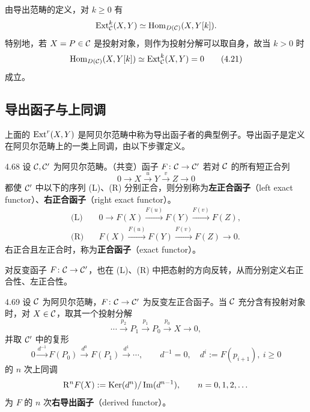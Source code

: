 由导出范畴的定义，对 $k\ge 0$ 有
\[ \operatorname{Ext}^k_{\mathcal{C}}(X,Y)\simeq\operatorname{Hom}_{D(\mathcal{C})}(X,Y[k]). \]
特别地，若 $X=P\in\mathcal{C}$ 是投射对象，则作为投射分解可以取自身，故当 $k>0$ 时
\begin{equation}
  \operatorname{Hom}_{D(\mathcal{C})}(X,Y[k])\simeq\operatorname{Ext}^k_{\mathcal{C}}(X,Y)=0 \tag{4.21}
\end{equation}
成立。

\subsection{导出函子与上同调}

上面的 $\operatorname{Ext}^r(X,Y)$ 是阿贝尔范畴中称为导出函子者的典型例子。导出函子是定义在阿贝尔范畴上的一类上同调，由以下步骤定义。
\begin{definition}{4.68}
设 $\mathcal{C},\mathcal{C}'$ 为阿贝尔范畴。（共变）函子 $F\colon\mathcal{C}\to\mathcal{C}'$ 若对 $\mathcal{C}$ 的所有短正合列
\[ 0\to X\xrightarrow{u}Y\xrightarrow{v}Z\to 0 \]
都使 $\mathcal{C}'$ 中以下的序列 (L)、(R) 分别正合，则分别称为\textbf{左正合函子}（left exact functor）、\textbf{右正合函子}（right exact functor）。
\begin{align*}
  \text{(L)}\quad & 0\to F(X)\xrightarrow{F(u)}F(Y)\xrightarrow{F(v)}F(Z),\\
  \text{(R)}\quad & F(X)\xrightarrow{F(u)}F(Y)\xrightarrow{F(v)}F(Z)\to 0.
\end{align*}
右正合且左正合时，称为\textbf{正合函子}（exact functor）。

对反变函子 $F\colon\mathcal{C}\to\mathcal{C}'$，也在 (L)、(R) 中把态射的方向反转，从而分别定义右正合性、左正合性。
\end{definition}

\begin{definition}{4.69}
设 $\mathcal{C}$ 为阿贝尔范畴，$F\colon\mathcal{C}\to\mathcal{C}'$ 为反变左正合函子。当 $\mathcal{C}$ 充分含有投射对象时，对 $X\in\mathcal{C}$，取其一个投射分解
\[ \cdots\xrightarrow{p_2}P_1\xrightarrow{p_1}P_0\xrightarrow{p_0}X\to 0, \]
并取 $\mathcal{C}'$ 中的复形
\[ 0\xrightarrow{d^{-1}}F(P_0)\xrightarrow{d^0}F(P_1)\xrightarrow{d^1}\cdots,\qquad d^{-1}=0,\quad d^i:=F(p_{i+1}),\ i\ge 0 \]
的 $n$ 次上同调
\[ \mathrm{R}^nF(X):=\operatorname{Ker}(d^n)/\operatorname{Im}(d^{n-1}),\qquad n=0,1,2,\dots \]
为 $F$ 的 $n$ 次\textbf{右导出函子}（derived functor）。
\end{definition}

